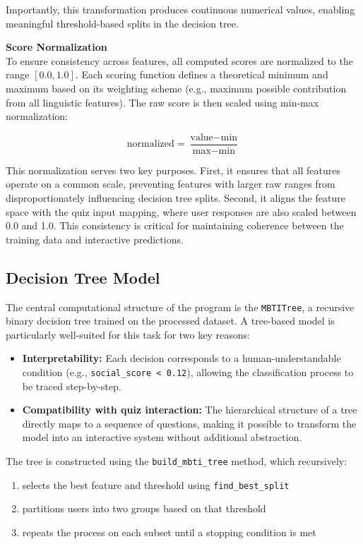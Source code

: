 \documentclass[11pt]{article}
\begin{document}
Importantly, this transformation produces continuous numerical values, enabling meaningful threshold-based splits in the decision tree.

\medskip


\noindent\textbf{Score Normalization} \\
\noindent To ensure consistency across features, all computed scores are normalized to the range $[0.0, 1.0]$. Each scoring function defines a theoretical minimum and maximum based on its weighting scheme (e.g., maximum possible contribution from all linguistic features). The raw score is then scaled using min-max normalization:

\[
\text{normalized} = \frac{\text{value} - \text{min}}{\text{max} - \text{min}}
\]

This normalization serves two key purposes. First, it ensures that all features operate on a common scale, preventing features with larger raw ranges from disproportionately influencing decision tree splits. Second, it aligns the feature space with the quiz input mapping, where user responses are also scaled between 0.0 and 1.0. This consistency is critical for maintaining coherence between the training data and interactive predictions.

\subsection{Decision Tree Model}

The central computational structure of the program is the \texttt{MBTITree}, a recursive binary decision tree trained on the processed dataset. A tree-based model is particularly well-suited for this task for two key reasons:

\begin{itemize}
    \item \textbf{Interpretability:} Each decision corresponds to a human-understandable condition (e.g., \texttt{social\_score < 0.12}), allowing the classification process to be traced step-by-step.
    \item \textbf{Compatibility with quiz interaction:} The hierarchical structure of a tree directly maps to a sequence of questions, making it possible to transform the model into an interactive system without additional abstraction.
\end{itemize}

The tree is constructed using the \texttt{build\_mbti\_tree} method, which recursively:
\begin{enumerate}
    \item selects the best feature and threshold using \texttt{find\_best\_split}
    \item partitions users into two groups based on that threshold
    \item repeats the process on each subset until a stopping condition is met
\end{enumerate}
\end{document}
